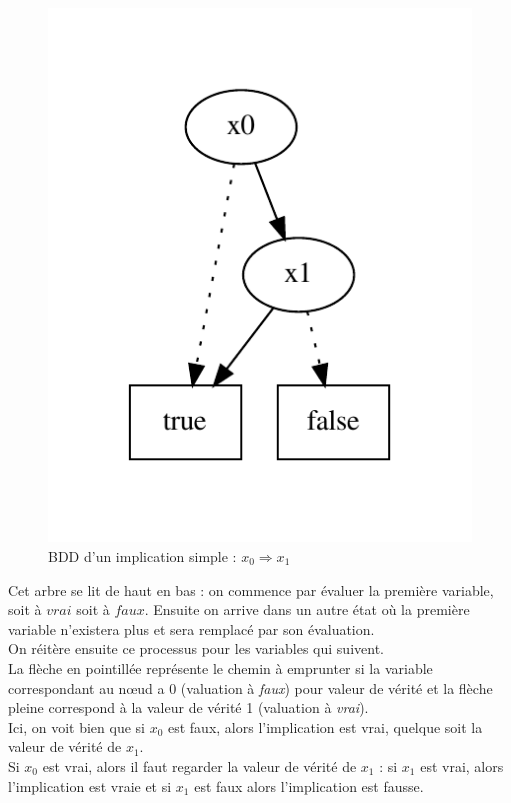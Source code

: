 \documentclass[a4paper, oneside]{report}
\begin{document}
\begin{figure}[htbp]
  \centering
  \includegraphics[trim = 0cm 1.5cm 0cm 1cm , scale=0.6]{exemple/impl_simple}
  \caption{BDD d'un implication simple : $x_0 \Rightarrow x_1$}
\end{figure}
Cet arbre se lit de haut en bas : on commence par évaluer la première variable, soit à $vrai$ soit à $faux$. Ensuite on arrive dans un autre état où la première variable n'existera plus et sera remplacé par son évaluation.\\
On réitère ensuite ce processus pour les variables qui suivent.\\
La flèche en pointillée représente le chemin à emprunter si la variable correspondant au nœud a 0 (valuation à \textit{faux}) pour valeur de vérité et la flèche pleine correspond à la valeur de vérité 1 (valuation à \textit{vrai}).\\
Ici, on voit bien que si $x_0$ est faux, alors l'implication est vrai, quelque soit la valeur de vérité de $x_1$.\\
Si $x_0$ est vrai, alors il faut regarder la valeur de vérité de $x_1$ : si $x_1$ est vrai, alors l'implication est vraie et si $x_1$ est faux alors l'implication est fausse.\\
\end{document}
